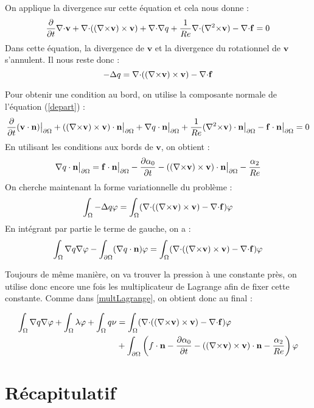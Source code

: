 On applique la divergence sur cette équation et cela nous donne :
\[ \frac{\partial}{\partial t}{\nabla\cdot} \mathbf{v} + {\nabla\cdot}(({\nabla\times} \mathbf{v})\times \mathbf{v}) + {\nabla\cdot}{\nabla} q + \frac{1}{Re}{\nabla\cdot}({\nabla^2\times} \mathbf{v}) - {\nabla\cdot} \mathbf{f} = 0 \]
Dans cette équation, la divergence de $\mathbf{v}$ et la divergence du rotationnel de $\mathbf{v}$ s'annulent. Il nous reste donc :
\begin{equation*}
-{\Delta} q = {\nabla\cdot}(({\nabla\times} \mathbf{v})\times \mathbf{v}) - {\nabla\cdot} \mathbf{f}
\end{equation*}

Pour obtenir une condition au bord, on utilise la composante normale de l'équation (\ref{depart}) :
\[ \frac{\partial}{\partial t}(\mathbf{v}\cdot \mathbf{n}){\big\rvert_{\partial\Omega}} + (({\nabla\times} \mathbf{v})\times \mathbf{v})\cdot \mathbf{n}{\big\rvert_{\partial\Omega}} + {\nabla} q\cdot \mathbf{n}{\big\rvert_{\partial\Omega}} +\frac{1}{Re}({\nabla^2\times} \mathbf{v})\cdot \mathbf{n}{\big\rvert_{\partial\Omega}} - \mathbf{f}\cdot \mathbf{n}{\big\rvert_{\partial\Omega}} = 0 \]
En utilisant les conditions aux bords de $\mathbf{v}$, on obtient :
\[ {\nabla} q\cdot \mathbf{n}{\big\rvert_{\partial\Omega}} =  \mathbf{f}\cdot \mathbf{n}{\big\rvert_{\partial\Omega}} - \frac{\partial\alpha_0}{\partial t} - (({\nabla\times} \mathbf{v})\times \mathbf{v})\cdot \mathbf{n}{\big\rvert_{\partial\Omega}} - \frac{\alpha_2}{Re} \]
On cherche maintenant la forme variationnelle du problème :
\[ \int_\Omega -{\Delta} q\varphi = \int_\Omega ({\nabla\cdot}(({\nabla\times} \mathbf{v})\times \mathbf{v}) -{\nabla\cdot} \mathbf{f})\varphi \]
En intégrant par partie le terme de gauche, on a :
\[ \int_\Omega {\nabla} q{\nabla}\varphi - \int_{\partial\Omega} ({\nabla} q\cdot \mathbf{n})\varphi = \int_\Omega ({\nabla\cdot}(({\nabla\times} \mathbf{v})\times \mathbf{v}) -{\nabla\cdot} \mathbf{f})\varphi \]

Toujours de même manière, on va trouver la pression à une constante près, on utilise donc encore une fois les multiplicateur de Lagrange afin de fixer cette constante. Comme dans \ref{multLagrange}, on obtient donc au final :
\begin{pb}\label{fvq}
\begin{align*}
\int_\Omega {\nabla} q{\nabla}\varphi + \int_\Omega \lambda\varphi + \int_\Omega q\nu &= \int_\Omega ({\nabla\cdot}(({\nabla\times} \mathbf{v})\times \mathbf{v}) -{\nabla\cdot} \mathbf{f})\varphi\\
&+ \int_{\partial\Omega} \left(f\cdot \mathbf{n} - \frac{\partial\alpha_0}{\partial t} - (({\nabla\times} \mathbf{v})\times \mathbf{v})\cdot \mathbf{n} - \frac{\alpha_2}{Re}\right)\varphi
\end{align*}\end{pb}

\chapter{Récapitulatif}

